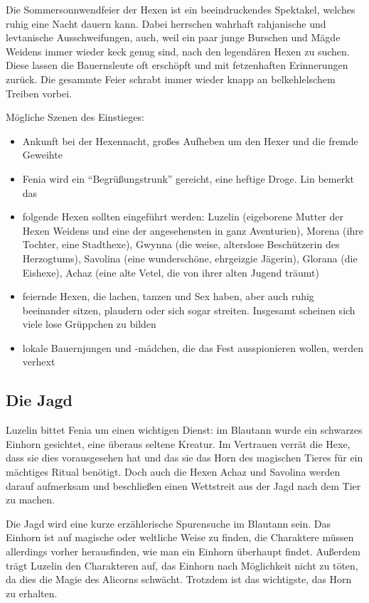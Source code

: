 Die Sommersonnwendfeier der Hexen ist ein beeindruckendes Spektakel, welches ruhig eine Nacht dauern kann. Dabei herrschen wahrhaft rahjanische und levtanische Ausschweifungen, auch, weil ein paar junge Burschen und Mägde Weidens immer wieder keck genug sind, nach den legendären Hexen zu suchen. Diese lassen die Bauernsleute oft erschöpft und mit fetzenhaften Erinnerungen zurück. Die gesammte Feier schrabt immer wieder knapp an belkehlelschem Treiben vorbei.

Mögliche Szenen des Einstieges:

\begin{itemize}
	\item Ankunft bei der Hexennacht, großes Aufheben um den Hexer und die fremde Geweihte
	\item Fenia wird ein ``Begrüßungstrunk'' gereicht, eine heftige Droge. Lin bemerkt das
	\item folgende Hexen sollten eingeführt werden: Luzelin (eigeborene Mutter der Hexen Weidens und eine der angesehensten in ganz Aventurien), Morena (ihre Tochter, eine Stadthexe), Gwynna (die weise, alterslose Beschützerin des Herzogtums), Savolina (eine wunderschöne, ehrgeizgie Jägerin), Glorana (die Eishexe), Achaz (eine alte Vetel, die von ihrer alten Jugend träumt)
	\item feiernde Hexen, die lachen, tanzen und Sex haben, aber auch ruhig beeinander sitzen, plaudern oder sich sogar streiten. Insgesamt scheinen sich viele lose Grüppchen zu bilden
	\item lokale Bauernjungen und -mädchen, die das Fest ausspionieren wollen, werden verhext
\end{itemize}


\subsection{Die Jagd}

Luzelin bittet Fenia um einen wichtigen Dienst: im Blautann wurde ein schwarzes Einhorn gesichtet, eine überaus seltene Kreatur. Im Vertrauen verrät die Hexe, dass sie dies vorausgesehen hat und das sie das Horn des magischen Tieres für ein mächtiges Ritual benötigt. Doch auch die Hexen Achaz und Savolina werden darauf aufmerksam und beschließen einen Wettstreit aus der Jagd nach dem Tier zu machen.

Die Jagd wird eine kurze erzählerische Spurensuche im Blautann sein. Das Einhorn ist auf magische oder weltliche Weise zu finden, die Charaktere müssen allerdings vorher herausfinden, wie man ein Einhorn überhaupt findet. Außerdem trägt Luzelin den Charakteren auf, das Einhorn nach Möglichkeit nicht zu töten, da dies die Magie des Alicorns schwächt. Trotzdem ist das wichtigste, das Horn zu erhalten.

